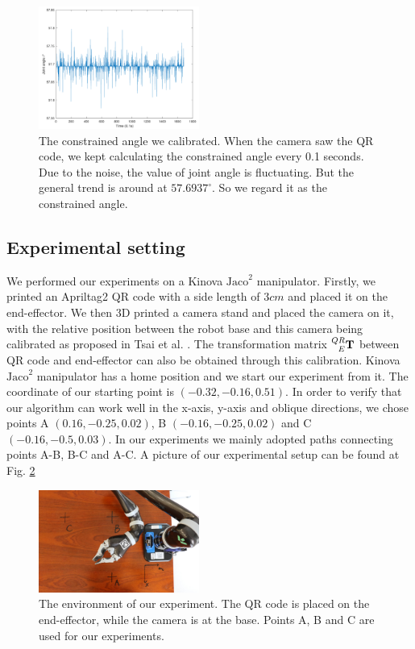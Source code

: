 \documentclass{ieeeaccess}
\newcommand{\degree}{^\circ}
\begin{document}
\begin{figure}[t!]
	\centering
	\includegraphics[width=0.47\textwidth,height=0.32\textwidth]{img/f9.pdf}
	\caption{The constrained angle we calibrated. When the camera saw the QR code, we kept calculating the constrained angle every 0.1 seconds. Due to the noise, the value of joint angle is fluctuating. But the general trend is around at $57.6937 \degree$. So we regard it as the constrained angle.}
	\label{f9}
\end{figure}

\subsection{Experimental setting}

We performed our experiments on a Kinova $\text{Jaco}^2$ manipulator. Firstly, we printed an Apriltag2 QR code with a side length of $3 cm$ and placed it on the end-effector. We then 3D printed a camera stand and placed the camera on it, with the relative position between the robot base and this camera being calibrated as proposed in Tsai et al. \cite{tsai1989new}. The transformation matrix $\prescript{QR}{E}{\mathbf{T}}$ between QR code and end-effector can also be obtained through this calibration. 
Kinova $\text{Jaco}^2$ manipulator has a home position and we start our experiment from it. The coordinate of our starting point is $(-0.32,-0.16,0.51)$. In order to verify that our algorithm can work well in the x-axis, y-axis and oblique directions, we chose points A $(0.16,-0.25,0.02)$, B $(-0.16,-0.25,0.02)$ and C $(-0.16,-0.5,0.03)$. In our experiments we mainly adopted paths connecting points A-B, B-C and A-C. A picture of our experimental setup can be found at Fig. \ref{f10}

\begin{figure}[t]
	\centering
	\includegraphics[width=0.47\textwidth,height=0.27\textwidth]{img/f10.jpg}\caption{The environment of our experiment. The QR code is placed on the end-effector, while the camera is at the base. Points A, B and C are used for our experiments.}
	\label{f10}
\end{figure}
\end{document}
